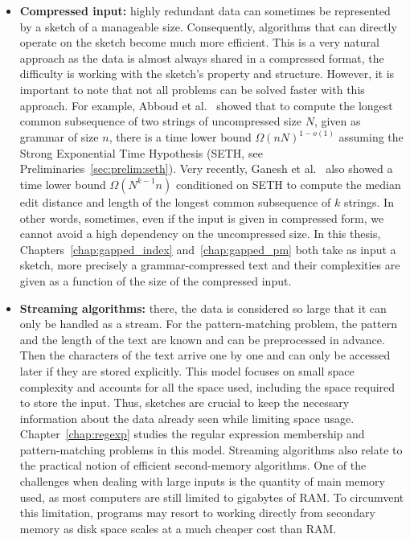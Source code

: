 \begin{itemize}
\item \textbf{Compressed input:} highly redundant data can sometimes be represented by a sketch of a manageable size. 
Consequently, algorithms that can directly operate on the sketch become much more efficient. This is a very natural approach as the data is almost always shared in a compressed format, the difficulty is working with the sketch's property and structure. However, it is important to note that not all problems can be solved faster with this approach. For example, Abboud et al.~\cite{abboud2017fine} showed that to compute the longest common subsequence of two strings of uncompressed size $N$, given as grammar of size $n$, there is a time lower bound $\Omega(nN)^{1-o(1)}$ assuming the Strong Exponential Time Hypothesis (SETH, see Preliminaries~\ref{sec:prelim:seth}). 
Very recently, Ganesh et al.~\cite{ganesh2022compression} also showed a time lower bound $\Omega(N^{k-1}n)$ conditioned on SETH to compute the median edit distance and length of the longest common subsequence of $k$ strings.
In other words, sometimes, even if the input is given in compressed form, we cannot avoid a high dependency on the uncompressed size. In this thesis, Chapters~\ref{chap:gapped_index} and~\ref{chap:gapped_pm} both take as input a sketch, more precisely a grammar-compressed text and their complexities are given as a function of the size of the compressed input.
%
\item \textbf{Streaming algorithms:} there, the data is considered so large that it can only be handled as a stream.
For the pattern-matching problem, the pattern and the length of the text are known and can be preprocessed in advance. Then the characters of the text arrive one by one and can only be accessed later if they are stored explicitly. 
This model focuses on small space complexity and accounts for all the space used, including the space required to store the input.
Thus, sketches are crucial to keep the necessary information about the data already seen while limiting space usage.
Chapter~\ref{chap:regexp} studies the regular expression membership and pattern-matching problems in this model.
Streaming algorithms also relate to the practical notion of efficient second-memory algorithms. One of the challenges when dealing with large inputs is the quantity of main memory used, as most computers are still limited to gigabytes of RAM. To circumvent this limitation, programs may resort to working directly from secondary memory as disk space scales at a much cheaper cost than RAM.

\end{itemize}
